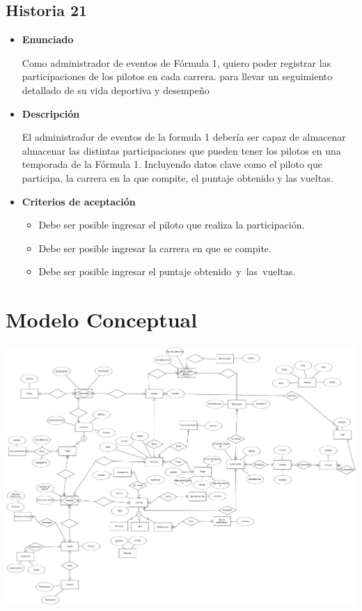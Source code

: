 \documentclass{article}
\begin{document}
\subsection{Historia 21}
\begin{itemize}
	
	\item \large{\textbf{Enunciado}}
	\begin{description}
Como administrador de eventos de Fórmula 1, quiero poder registrar las participaciones de los pilotos en cada carrera. para llevar un seguimiento detallado de su vida deportiva y desempeño
		
	\end{description}
	
	\item \large{\textbf{Descripción}}
	\begin{description}
	El administrador de eventos de la formula 1 debería ser capaz de almacenar almacenar las distintas participaciones que pueden tener los pilotos en una temporada de la Fórmula 1. Incluyendo datos clave como el piloto que participa, la carrera en la que compite, el puntaje obtenido y las vueltas.

		
	\end{description}
	
	\item \large{\textbf{Criterios de aceptación}}
	\begin{itemize}
		\item Debe ser posible ingresar el piloto que realiza la participación.
		\item Debe ser posible ingresar la carrera en que se compite.
		\item Debe ser posible ingresar el puntaje obtenido y las vueltas.
		
	\end{itemize}
	
\end{itemize}
	
	\section{Modelo Conceptual}
	
	\includegraphics[width=\textwidth]{f1_conceptual}
	
\end{document}
